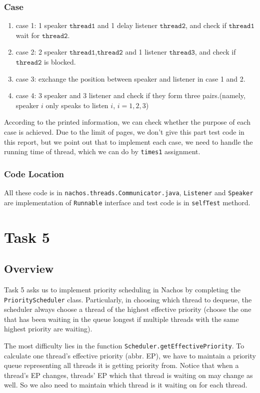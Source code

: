 \documentclass{article}
\begin{document}
\begin{spacing}{1.1}
\subsubsection{Case}
\begin{enumerate}
  \item[] case 1: 1 speaker $\texttt{thread1}$ and 1 delay listener $\texttt{thread2}$,
    and check if $\texttt{thread1}$ wait for $\texttt{thread2}$.
  \item[] case 2: 2 speaker $\texttt{thread1}$,$\texttt{thread2}$ and
    1 listener $\texttt{thread3}$, and check if $\texttt{thread2}$ is blocked.
  \item[] case 3: exchange the position between speaker and listener in case 1 and 2.
  \item[] case 4: 3 speaker and 3 listener and check if they form three pairs.(namely,
    speaker $i$ only speaks to listen $i$, $i=1,2,3$)
\end{enumerate}
According to the printed information, we can check whether the purpose of each case is achieved. Due
to the limit of pages, we don't give this part test code in this report, but we point out that to implement
each case, we need to handle the running time of thread, which we can do by \texttt{times1} assignment.
\subsubsection{Code Location}
All these code is in \texttt{nachos.threads.Communicator.java}, \texttt{Listener} and \texttt{Speaker} are 
implementation of \texttt{Runnable} interface and test code is in \texttt{selfTest} methord.
\section{Task 5}
\subsection{Overview}
Task 5 asks us to implement priority scheduling in Nachos by completing the \texttt{PriorityScheduler} class. Particularly, in choosing which  thread to dequeue, the scheduler always choose a thread of the highest effective priority (choose the one that has been waiting in the queue longest if multiple threads with the same highest priority are waiting).

The most difficulty lies in the function \texttt{Scheduler.getEffectivePriority}. To calculate one thread's effective priority (abbr. EP), we have to maintain a priority queue representing all threads it is getting priority from. Notice that when a thread's EP changes, threads' EP which that thread is waiting on may change as well. So we also need to maintain which thread is it waiting on for each thread.


\end{spacing}
\end{document}
